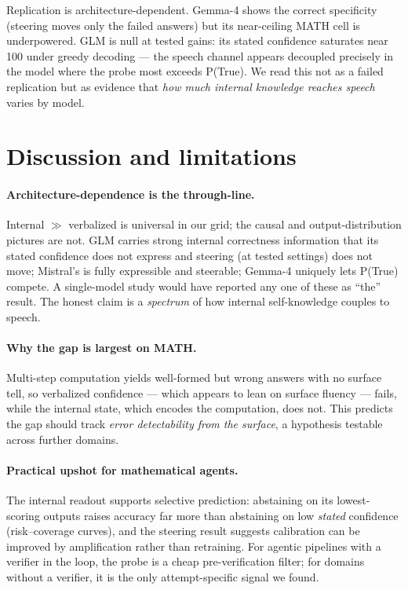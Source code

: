 \documentclass{article}
\begin{document}
Replication is architecture-dependent.
Gemma-4 shows the correct specificity (steering moves only the failed answers) but its near-ceiling MATH cell is underpowered.
GLM is null at tested gains: its stated confidence saturates near 100 under greedy decoding --- the speech channel appears decoupled precisely in the model where the probe most exceeds P(True).
We read this not as a failed replication but as evidence that \emph{how much internal knowledge reaches speech} varies by model.

\section{Discussion and limitations}
\label{sec:discussion}

\paragraph{Architecture-dependence is the through-line.}
Internal $\gg$ verbalized is universal in our grid; the causal and output-distribution pictures are not.
GLM carries strong internal correctness information that its stated confidence does not express and steering (at tested settings) does not move; Mistral's is fully expressible and steerable; Gemma-4 uniquely lets P(True) compete.
A single-model study would have reported any one of these as ``the'' result.
The honest claim is a \emph{spectrum} of how internal self-knowledge couples to speech.

\paragraph{Why the gap is largest on MATH.}
Multi-step computation yields well-formed but wrong answers with no surface tell, so verbalized confidence --- which appears to lean on surface fluency --- fails, while the internal state, which encodes the computation, does not.
This predicts the gap should track \emph{error detectability from the surface}, a hypothesis testable across further domains.

\paragraph{Practical upshot for mathematical agents.}
The internal readout supports selective prediction: abstaining on its lowest-scoring outputs raises accuracy far more than abstaining on low \emph{stated} confidence (risk--coverage curves), and the steering result suggests calibration can be improved by amplification rather than retraining.
For agentic pipelines with a verifier in the loop, the probe is a cheap pre-verification filter; for domains without a verifier, it is the only attempt-specific signal we found.
\end{document}
